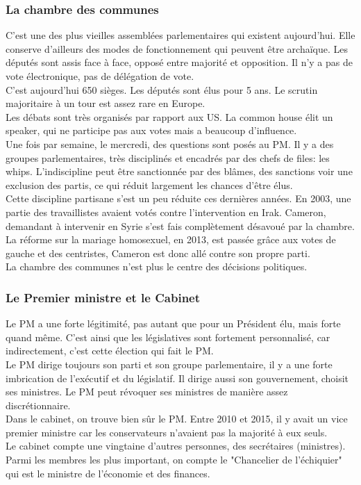 \documentclass[10pt, a4paper, openany]{book}
\begin{document}
\subsubsection{La chambre des communes}

C'est une des plus vieilles assemblées parlementaires qui existent aujourd'hui. Elle conserve d'ailleurs des modes de fonctionnement qui peuvent être archaïque. Les députés sont assis face à face, opposé entre majorité et opposition. Il n'y a pas de vote électronique, pas de délégation de vote. \\
C'est aujourd'hui 650 sièges. Les députés sont élus pour 5 ans. Le scrutin majoritaire à un tour est assez rare en Europe. \\
Les débats sont très organisés par rapport aux US. La common house élit un speaker, qui ne participe pas aux votes mais a beaucoup d'influence. \\
Une fois par semaine, le mercredi, des questions sont posés au PM. Il y a des groupes parlementaires, très disciplinés et encadrés par des chefs de files: les whips. L'indiscipline peut être sanctionnée par des blâmes, des sanctions voir une exclusion des partis, ce qui réduit largement les chances d'être élus. \\
Cette discipline partisane s'est un peu réduite ces dernières années. En 2003, une partie des travaillistes avaient votés contre l'intervention en Irak. Cameron, demandant à intervenir en Syrie s'est fais complètement désavoué par la chambre. La réforme sur la mariage homosexuel, en 2013, est passée grâce aux votes de gauche et des centristes, Cameron est donc allé contre son propre parti. \\
La chambre des communes n'est plus le centre des décisions politiques.

\subsubsection{Le Premier ministre et le Cabinet}

Le PM a une forte légitimité, pas autant que pour un Président élu, mais forte quand même. C'est ainsi que les législatives sont fortement personnalisé, car indirectement, c'est cette élection qui fait le PM. \\
Le PM dirige toujours son parti et son groupe parlementaire, il y a une forte imbrication de l'exécutif et du législatif. Il dirige aussi son gouvernement, choisit ses ministres. Le PM peut révoquer ses ministres de manière assez discrétionnaire. \\
Dans le cabinet, on trouve bien sûr le PM. Entre 2010 et 2015, il y avait un vice premier ministre car les conservateurs n'avaient pas la majorité à eux seuls. \\
Le cabinet compte une vingtaine d'autres personnes, des secrétaires (ministres). Parmi les membres les plus important, on compte le "Chancelier de l'échiquier" qui est le ministre de l'économie et des finances. 
\end{document}
